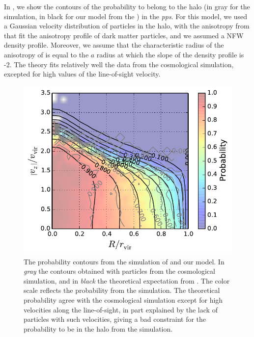In , we show the contours of the probability to
belong to the halo (in gray for the simulation, in black for our model from the
) in the \emph{pps}. For this model, we used a
Gaussian velocity distribution of particles in the halo, with the anisotropy
from \citet{ML+05} that fit the anisotropy profile of dark matter particles,
and we assumed a NFW density profile. Moreover, we assume that the
characteristic radius of the anisotropy of \citet{ML+05} is equal to the $a$
radius at which the slope of the density profile is -2. The theory fits
relatively well the data from the cosmological simulation, excepted for high
values of the line-of-sight velocity.
%
\begin{figure}[ht]
    \centering
    \includegraphics[width=0.6\linewidth]{figures/maggie/probabilities.pdf}
    \caption{The probability contours from the simulation of \citet{Borgani+01}
        and our model. In \emph{gray} the contours obtained with particles from
        the cosmological simulation, and in \emph{black} the theoretical
        expectation from . The color scale reflects
        the probability from the simulation. The theoretical probability agree
        with the cosmological simulation except for high velocities along the
        line-of-sight, in part explained by the lack of particles with such
        velocities, giving a bad constraint for the probability to be in the
        halo from the simulation.
\label{fig:probabilities}}
\end{figure}

